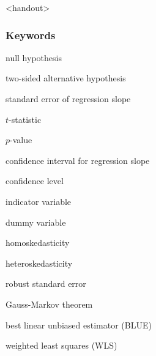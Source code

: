 

\begin{frame}<handout>
\frametitle{Keywords}
\begin{iteminline}
\item null hypothesis
\item two-sided alternative hypothesis
\item standard error of regression slope
\item $t$-statistic
\item $p$-value
\item confidence interval for regression slope
\item confidence level
\item indicator variable
\item dummy variable
\item homoskedasticity
\item heteroskedasticity
\item robust standard error
\item Gauss-Markov theorem
\item best linear unbiased estimator (BLUE)
\item weighted least squares (WLS)
\end{iteminline}
\end{frame}


